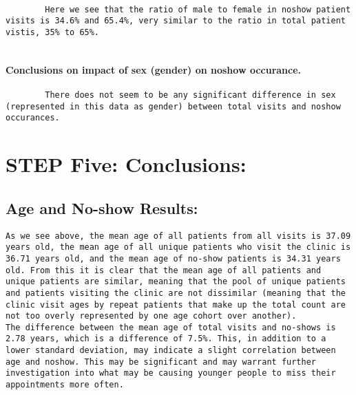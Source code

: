 \documentclass[11pt]{article}
\begin{document}
    \begin{center}
    \end{center}
    { \hspace*{\fill} \\}
    
    \begin{verbatim}
        Here we see that the ratio of male to female in noshow patient visits is 34.6% and 65.4%, very similar to the ratio in total patient vistis, 35% to 65%. 
        
\end{verbatim}

\paragraph{Conclusions on impact of sex (gender) on noshow
occurance.}\label{conclusions-on-impact-of-sex-gender-on-noshow-occurance.}

\begin{verbatim}
        There does not seem to be any significant difference in sex (represented in this data as gender) between total visits and noshow occurances.
\end{verbatim}

    \section{STEP Five: Conclusions:}\label{step-five-conclusions}

    \subsection{Age and No-show Results:}\label{age-and-no-show-results}

\begin{verbatim}
As we see above, the mean age of all patients from all visits is 37.09 years old, the mean age of all unique patients who visit the clinic is 36.71 years old, and the mean age of no-show patients is 34.31 years old. From this it is clear that the mean age of all patients and unique patients are similar, meaning that the pool of unique patients and patients visiting the clinic are not dissimilar (meaning that the clinic visit ages by repeat patients that make up the total count are not too overly represented by one age cohort over another). 
The difference between the mean age of total visits and no-shows is 2.78 years, which is a difference of 7.5%. This, in addition to a lower standard deviation, may indicate a slight correlation between age and noshow. This may be significant and may warrant further investigation into what may be causing younger people to miss their appointments more often. 
\end{verbatim}
\end{document}
